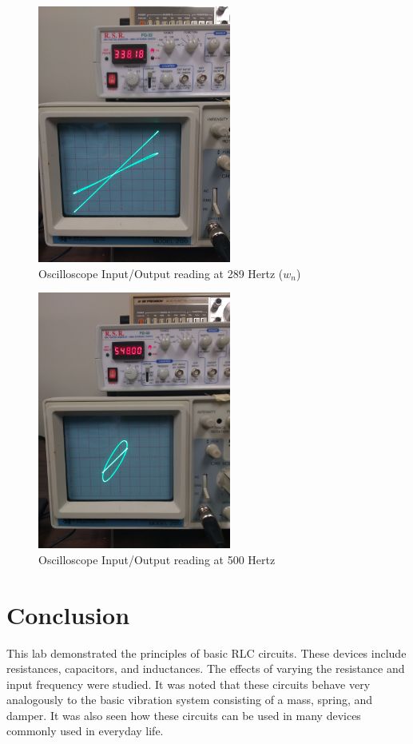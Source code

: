 \documentclass[12pt]{article}
\begin{document}
\begin{figure}[h!] %
   \centering
   \includegraphics[width=2.5in]{ab_at_nat_freq.jpg} 
   \caption{Oscilloscope Input/Output reading at 289 Hertz ($w_{n}$)}
   \label{fig:example}
\end{figure}

\newpage

\begin{figure}[h] %
   \centering
   \includegraphics[width=2.5in]{ab_above_nat_freq.jpg} 
   \caption{Oscilloscope Input/Output reading at 500 Hertz}
   \label{fig:example}
\end{figure}
\bigskip


\section*{\fontsize{12}{12}\selectfont \large Conclusion}
This lab demonstrated the principles of basic RLC circuits. These devices include resistances, capacitors, and inductances. The effects of varying the resistance and input frequency were studied. It was noted that these circuits behave very analogously to the basic vibration system consisting of a mass, spring, and damper. It was also seen how these circuits can be used in many devices commonly used in everyday life.
\end{document}
